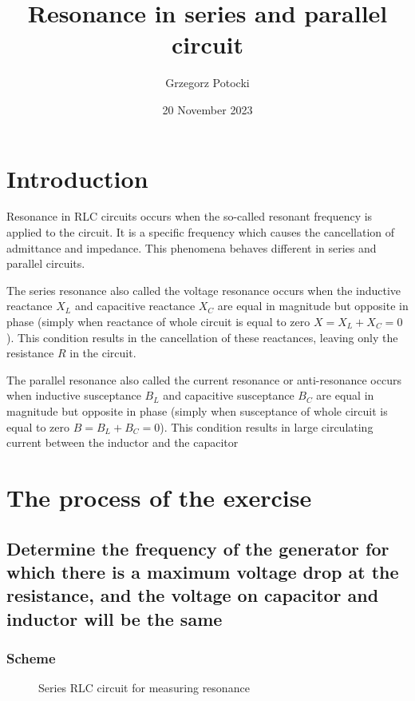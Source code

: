 \documentclass[]{scrartcl}
\title{Resonance in series and parallel circuit}
\author{Grzegorz Potocki}
\date{20 November 2023}
\begin{document}
	


\section{Introduction}

\begin{flushleft}
    Resonance in RLC circuits occurs when the so-called resonant frequency is applied to the circuit. It is a specific frequency which causes the cancellation of admittance and impedance. This phenomena behaves different in series and parallel circuits.
\end{flushleft}  

\begin{flushleft}
    The series resonance also called the voltage resonance occurs when  the inductive reactance $X_L$ and capacitive reactance $X_C$ are equal in magnitude but opposite in phase (simply when reactance of whole circuit is equal to zero $X=X_L+X_C=0$). This condition results in the cancellation of these reactances, leaving only the resistance $R$ in the circuit. 
\end{flushleft}

\begin{flushleft}
    The parallel resonance also called the current resonance or anti-resonance occurs when inductive susceptance $B_L$ and capacitive susceptance $B_C$ are equal in magnitude but opposite in phase (simply when susceptance of whole circuit is equal to zero $B=B_L+B_C=0$). This condition results in large circulating current between the inductor and the capacitor
\end{flushleft}

\section{The process of the exercise}

\subsection{Determine the frequency of the generator for which there is a maximum voltage drop at the resistance, and the voltage on capacitor and inductor will be the same}

\subsubsection{Scheme}

\begin{figure}[H]
	\centering
	
	\caption{Series RLC circuit for measuring resonance}
	\label{fig:circuitfig_series}
\end{figure}
\end{document}
